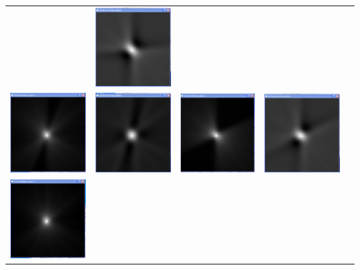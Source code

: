 \begin{longtable}{p{3cm}p{3cm}p{3cm}p{3cm}c}
                  & 
                  \includegraphics[width=.2\textwidth, height=0.125\textheight]{pic/Einzelfenster_Bilder/isotrope_Messung/iso3gef_prj.png}\\
                  \includegraphics[width=.2\textwidth, height=0.125\textheight]{pic/Einzelfenster_Bilder/inhomogene_Messung/inhomo4einf_rueckprj.png}
                  & 
                  \includegraphics[width=.2\textwidth, height=0.125\textheight]{pic/Einzelfenster_Bilder/inhomogene_Messung/inhomo4gef_prj.png}
                  &
                  \includegraphics[width=.2\textwidth, height=0.125\textheight]{pic/Einzelfenster_Bilder/isotrope_Messung/iso4einf_prj.png}
                  & 
                  \includegraphics[width=.2\textwidth, height=0.125\textheight]{pic/Einzelfenster_Bilder/isotrope_Messung/iso4gef_prj.png}\\
                  \includegraphics[width=.2\textwidth, height=0.125\textheight]{pic/Einzelfenster_Bilder/inhomogene_Messung/inhomo5einf_rueckprj.png}

\end{longtable}
